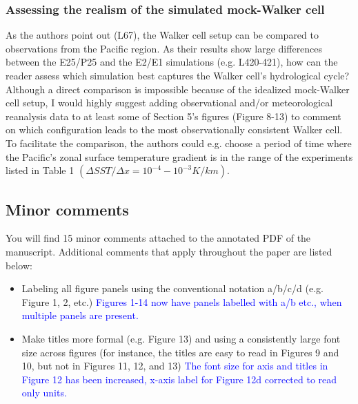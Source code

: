 \documentclass[draft]{agujournal2019}
\begin{document}
\subsubsection{Assessing the realism of the simulated mock-Walker cell}

As the authors point out (L67), the Walker cell setup can be compared to observations from the Pacific region. As their
results show large differences between the E25/P25 and the E2/E1 simulations (e.g. L420-421), how can the reader
assess which simulation best captures the Walker cell’s hydrological cycle?
Although a direct comparison is impossible because of the idealized mock-Walker cell setup, I would highly suggest
adding observational and/or meteorological reanalysis data to at least some of Section 5’s figures (Figure 8-13) to comment
on which configuration leads to the most observationally consistent Walker cell. To facilitate the comparison, the authors
could e.g. choose a period of time where the Pacific’s zonal surface temperature gradient is in the range of the experiments
listed in Table 1 $(\Delta SST/ \Delta x = 10^{-4} - 10^{-3} K/km).  $

\subsection{Minor comments}

You will find 15 minor comments attached to the annotated PDF of the manuscript. Additional comments that apply
throughout the paper are listed below:
\begin{itemize}
  \item Labeling all figure panels using the conventional notation a/b/c/d (e.g. Figure 1, 2, etc.)
  \textcolor{blue}{Figures 1-14 now have panels labelled with a/b etc., when multiple panels are present.}
  
  \item Make titles more formal (e.g. Figure 13) and using a consistently large font size across figures (for instance, the
titles are easy to read in Figures 9 and 10, but not in Figures 11, 12, and 13)
  \textcolor{blue}{The font size for axis and titles in Figure 12 has been increased, x-axis label for Figure 12d corrected to read only units.}
\end{itemize}







%
%
\end{document}
